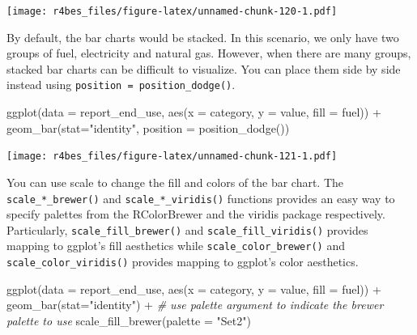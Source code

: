 \documentclass[
]{book}
\newenvironment{Shaded}{\begin{snugshade}}{\end{snugshade}}
\newcommand{\AttributeTok}[1]{\textcolor[rgb]{0.77,0.63,0.00}{#1}}
\newcommand{\CommentTok}[1]{\textcolor[rgb]{0.56,0.35,0.01}{\textit{#1}}}
\newcommand{\FunctionTok}[1]{\textcolor[rgb]{0.00,0.00,0.00}{#1}}
\newcommand{\NormalTok}[1]{#1}
\newcommand{\SpecialCharTok}[1]{\textcolor[rgb]{0.00,0.00,0.00}{#1}}
\newcommand{\StringTok}[1]{\textcolor[rgb]{0.31,0.60,0.02}{#1}}
\begin{document}
\texttt{[image: r4bes\_files/figure-latex/unnamed-chunk-120-1.pdf]}

By default, the bar charts would be stacked. In this scenario, we only have two groups of fuel, electricity and natural gas. However, when there are many groups, stacked bar charts can be difficult to visualize. You can place them side by side instead using \texttt{position\ =\ position\_dodge()}.

\begin{Shaded}
\begin{Highlighting}[]
\FunctionTok{ggplot}\NormalTok{(}\AttributeTok{data =}\NormalTok{ report\_end\_use, }\FunctionTok{aes}\NormalTok{(}\AttributeTok{x =}\NormalTok{ category, }\AttributeTok{y =}\NormalTok{ value, }\AttributeTok{fill =}\NormalTok{ fuel)) }\SpecialCharTok{+}
    \FunctionTok{geom\_bar}\NormalTok{(}\AttributeTok{stat=}\StringTok{"identity"}\NormalTok{, }\AttributeTok{position =} \FunctionTok{position\_dodge}\NormalTok{())}
\end{Highlighting}
\end{Shaded}

\texttt{[image: r4bes\_files/figure-latex/unnamed-chunk-121-1.pdf]}

You can use scale to change the fill and colors of the bar chart. The \texttt{scale\_*\_brewer()} and \texttt{scale\_*\_viridis()} functions provides an easy way to specify palettes from the RColorBrewer and the viridis package respectively. Particularly, \texttt{scale\_fill\_brewer()} and \texttt{scale\_fill\_viridis()} provides mapping to ggplot's fill aesthetics while \texttt{scale\_color\_brewer()} and \texttt{scale\_color\_viridis()} provides mapping to ggplot's color aesthetics.

\begin{Shaded}
\begin{Highlighting}[]
\FunctionTok{ggplot}\NormalTok{(}\AttributeTok{data =}\NormalTok{ report\_end\_use, }\FunctionTok{aes}\NormalTok{(}\AttributeTok{x =}\NormalTok{ category, }\AttributeTok{y =}\NormalTok{ value, }\AttributeTok{fill =}\NormalTok{ fuel)) }\SpecialCharTok{+}
    \FunctionTok{geom\_bar}\NormalTok{(}\AttributeTok{stat=}\StringTok{"identity"}\NormalTok{) }\SpecialCharTok{+} 
    \CommentTok{\# use palette argument to indicate the brewer palette to use}
    \FunctionTok{scale\_fill\_brewer}\NormalTok{(}\AttributeTok{palette =} \StringTok{"Set2"}\NormalTok{) }
\end{Highlighting}
\end{Shaded}
\end{document}

